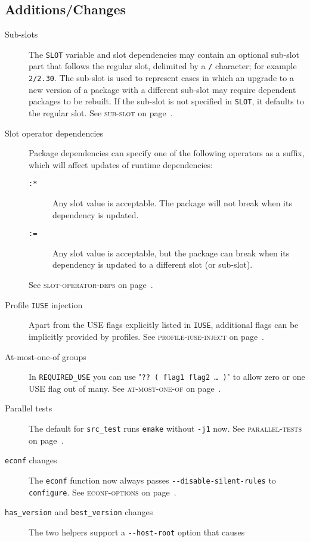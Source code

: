\documentclass[a4paper,nofoldmark]{leaflet}
\newcommand{\code}[1]{\texttt{#1}}
\newcommand{\featureref}[1]{\textsc{#1} on page~\pageref{feat:#1}}
\begin{document}
\subsection{Additions/Changes}
\label{sec:cs:eapi5-additions}
\begin{description}
    \item[Sub-slots] The \code{SLOT} variable and slot dependencies
    may contain an optional sub-slot part that follows the regular
    slot, delimited by a \code{/} character; for example
    \code{2/2.30}.  The sub-slot is used to represent cases in which
    an upgrade to a new version of a package with a different sub-slot
    may require dependent packages to be rebuilt.  If the sub-slot is
    not specified in \code{SLOT}, it defaults to the regular slot.
    See \featureref{sub-slot}.
    \item[Slot operator dependencies] Package dependencies can specify
    one of the following operators as a suffix, which will affect
    updates of runtime dependencies:
    \begin{description}
        \item[\code{:*}] Any slot value is acceptable.  The package
        will not break when its dependency is updated.
        \item[\code{:=}] Any slot value is acceptable, but the package
        can break when its dependency is updated to a different slot
        (or sub-slot).
    \end{description}
    See \featureref{slot-operator-deps}.
    \item[Profile \code{IUSE} injection] Apart from the USE flags
    explicitly listed in \code{IUSE}, additional flags can be
    implicitly provided by profiles.
    See \featureref{profile-iuse-inject}.
    \item[At-most-one-of groups] In \code{REQUIRED\_USE} you can use
    "\code{??\ ( flag1 flag2 \dots\ )}" to allow zero or one USE flag
    out of many.
    See \featureref{at-most-one-of}.
    \item[Parallel tests] The default for \code{src\_test} runs
    \code{emake} without \code{-j1} now.
    See \featureref{parallel-tests}.
    \item[\code{econf} changes] The \code{econf} function now always
    passes \code{-{}-disable-silent-rules} to \code{configure}.
    See \featureref{econf-options}.
    \item[\code{has\_version} and \code{best\_version} changes]
    The two helpers support a \code{-{}-host-root} option that causes

\end{description}
\end{document}

